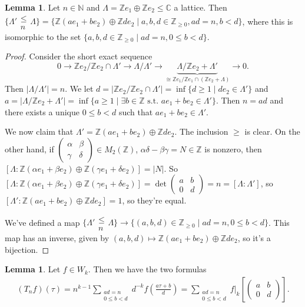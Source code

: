 \documentclass{article}
\theoremstyle{definition}
\newtheorem{lemma}[theorem]{Lemma}
\begin{document}
\begin{lemma}
    Let $n \in \mathbb{N}$ and $\Lambda = \mathbb{Z}e_1 \oplus \mathbb{Z}e_2 \le \mathbb{C}$ a lattice. Then $\{\Lambda' \substack{\le \\ n}\Lambda\} = \{\mathbb{Z}(ae_1 + be_2)\oplus \mathbb{Z}de_2 \mid a,b,d \in \mathbb{Z}_{\ge 0}, ad = n, b < d\}$, where this is isomorphic to the set $\{a,b,d \in \mathbb{Z}_{\ge 0} \mid ad=n, 0\le b<d\}$.
\end{lemma}
\begin{proof}
    Consider the short exact sequence \[
    0 \to \mathbb{Z}e_2/\mathbb{Z}e_2 \cap \Lambda' \to \Lambda/\Lambda' \to \underbrace{\Lambda/\mathbb{Z}e_2 + \Lambda'}_{\cong \mathbb{Z}e_1/\mathbb{Z}e_1 \cap (\mathbb{Z}e_2 + \Lambda)} \to 0.
    \]
    Then $|\Lambda/\Lambda'| = n$. We let $d = |\mathbb{Z}e_2/\mathbb{Z}e_2 \cap \Lambda'| = \inf \{d \ge 1 \mid de_2 \in \Lambda'\}$ and $a = |\Lambda/\mathbb{Z}e_2 + \Lambda'| =\inf\{a\ge 1 \mid \exists b \in \mathbb{Z} \text{ s.t. }ae_1+be_2 \in \Lambda'\}$. Then $n = ad$ and there exists a unique $0\le b<d$ such that $ae_1 + be_2 \in \Lambda'$.
    \vspace{1mm}
     
    We now claim that $\Lambda' = \mathbb{Z}(ae_1 + be_2) \oplus \mathbb{Z}de_2$. The inclusion $\ge $ is clear. On the other hand, if $\begin{pmatrix} \alpha & \beta \\ \gamma & \delta \end{pmatrix} \in M_2(\mathbb{Z})$, $\alpha \delta - \beta \gamma = N \in \mathbb{Z}$ is nonzero, then $[\Lambda : \mathbb{Z}(\alpha e_1 + \beta e_2) \oplus \mathbb{Z}(\gamma e_1 + \delta e_2)] = |N|$. So $[\Lambda : \mathbb{Z}(\alpha e_1 + \beta e_2) \oplus \mathbb{Z}(\gamma e_1 + \delta e_2)] = \det \begin{pmatrix} a & b \\ 0 & d \end{pmatrix} = n = [\Lambda : \Lambda']$, so $[\Lambda': \mathbb{Z}(ae_1 + be_2) \oplus \mathbb{Z}de_2] = 1$, so they're equal.
    \vspace{1mm}
     
    We've defined a map $\{\Lambda' \substack{\le \\ n}\Lambda\} \to \{(a,b,d) \in \mathbb{Z}_{\ge 0} \mid ad=n, 0 \le b <d\}$. This map has an inverse, given by $(a,b,d) \mapsto \mathbb{Z}(a e_1 + be_2) \oplus \mathbb{Z} de_2$, so it's a bijection.
\end{proof}
\begin{lemma}
    Let $f \in W_k$. Then we have the two formulas
    \begin{align*}
        (T_n f)(\tau) = n^{k-1}\sum_{\substack{ad=n \\0\le b<d}} d^{-k} f\left(\frac{a \tau + b}{d}\right) = \sum_{\substack{ad=n \\0\le b<d}} f|_k\left[\begin{pmatrix} a & b\\0 &d \end{pmatrix}\right].
    \end{align*}
\end{lemma}
\end{document}

